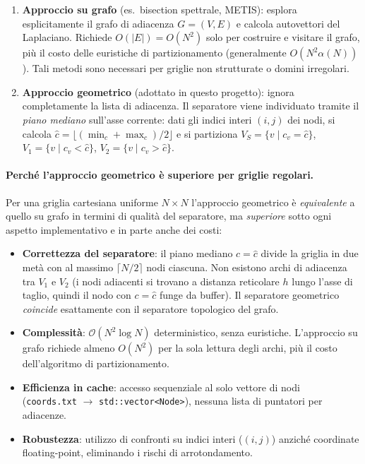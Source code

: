 \documentclass[a4paper,12pt]{article}
\begin{document}
\begin{enumerate}
  \item \textbf{Approccio su grafo} (es.\ bisection spettrale, METIS): esplora esplicitamente il grafo di adiacenza $G=(V,E)$ e calcola autovettori del Laplaciano. Richiede $O(|E|) = O(N^2)$ solo per costruire e visitare il grafo, più il costo delle euristiche di partizionamento (generalmente $O(N^2 \alpha(N))$). Tali metodi sono necessari per griglie non strutturate o domini irregolari.
  
  \item \textbf{Approccio geometrico} (adottato in questo progetto): ignora completamente la lista di adiacenza. Il separatore viene individuato tramite il \emph{piano mediano} sull'asse corrente: dati gli indici interi $(i, j)$ dei nodi, si calcola $\hat{c} = \lfloor(\min_c + \max_c)/2\rfloor$ e si partiziona $V_S = \{v \mid c_v = \hat{c}\}$, $V_1 = \{v \mid c_v < \hat{c}\}$, $V_2 = \{v \mid c_v > \hat{c}\}$.
\end{enumerate}

\paragraph{Perché l'approccio geometrico è superiore per griglie regolari.}
Per una griglia cartesiana uniforme $N \times N$ l'approccio geometrico è \emph{equivalente} a quello su grafo in termini di qualità del separatore, ma \emph{superiore} sotto ogni aspetto implementativo e in parte anche dei costi:

\begin{itemize}
  \item \textbf{Correttezza del separatore}: il piano mediano $c = \hat{c}$ divide la griglia in due metà con al massimo $\lceil N/2 \rceil$ nodi ciascuna. Non esistono archi di adiacenza tra $V_1$ e $V_2$ (i nodi adiacenti si trovano a distanza reticolare $h$ lungo l'asse di taglio, quindi il nodo con $c = \hat{c}$ funge da buffer). Il separatore geometrico \emph{coincide} esattamente con il separatore topologico del grafo.
  \item \textbf{Complessità}: $\mathcal{O}(N^2 \log N)$ deterministico, senza euristiche. L'approccio su grafo richiede almeno $O(N^2)$ per la sola lettura degli archi, più il costo dell'algoritmo di partizionamento.
  \item \textbf{Efficienza in cache}: accesso sequenziale al solo vettore di nodi \\ (\texttt{coords.txt} $\rightarrow$ \texttt{std::vector<Node>}), nessuna lista di puntatori per adiacenze.
  \item \textbf{Robustezza}: utilizzo di confronti su indici interi ($(i,j)$) anziché coordinate floating-point, eliminando i rischi di arrotondamento.
\end{itemize}
\end{document}

